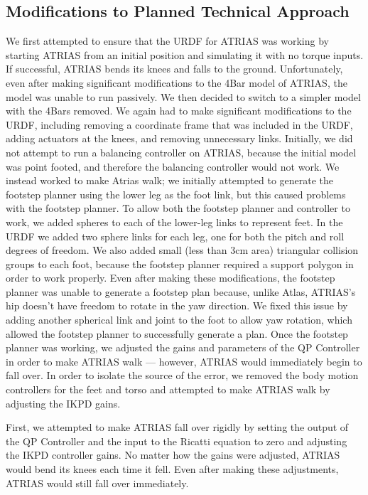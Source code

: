 \documentclass[letterpaper, 10 pt, conference]{ieeeconf}  %
\begin{document}
\subsection{Modifications to Planned Technical Approach}


We first attempted to ensure that the URDF for ATRIAS was working by starting ATRIAS from an initial position and simulating it with no torque inputs. If successful, ATRIAS bends its knees and falls to the ground. Unfortunately, even after making significant modifications to the 4Bar model of ATRIAS, the model was unable to run passively. We then decided to switch to a simpler model with the 4Bars removed. We again had to make significant modifications to the URDF, including removing a coordinate frame that was included in the URDF, adding actuators at the knees, and removing unnecessary links. Initially, we did not attempt to run a balancing controller on ATRIAS, because the initial model was point footed, and therefore the balancing controller would not work. We instead worked to make Atrias walk; we initially attempted to generate the footstep planner using the lower leg as the foot link, but this caused problems with the footstep planner. To allow both the footstep planner and controller to work, we added spheres to each of the lower-leg links to represent feet. In the URDF we added two sphere links for each leg, one for both the pitch and roll degrees of freedom. We also added small (less than 3cm area) triangular collision groups to each foot, because the footstep planner required a support polygon in order to work properly. Even after making these modifications, the footstep planner was unable to generate a footstep plan because, unlike Atlas, ATRIAS's hip doesn’t have freedom to rotate in the yaw direction. We fixed this issue by adding another spherical link and joint to the foot to allow yaw rotation, which allowed the footstep planner to successfully generate a plan. 
Once the footstep planner was working, we adjusted the gains and parameters of the QP Controller in order to make ATRIAS walk --- however, ATRIAS would immediately begin to fall over. In order to isolate the source of the error, we removed the body motion controllers for the feet and torso and attempted to make ATRIAS walk by adjusting the IKPD gains.

First, we attempted to make ATRIAS  fall over rigidly by setting the output of the QP Controller and the input to the Ricatti equation to zero and adjusting the IKPD controller gains. No matter how the gains were adjusted, ATRIAS would bend its knees each time it fell. Even after making these adjustments, ATRIAS would still fall over immediately.
\end{document}
